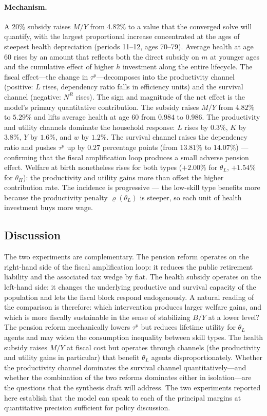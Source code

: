 \documentclass[12pt,a4paper]{article}
\begin{document}
\paragraph{Mechanism.} A 20\% subsidy raises $M/Y$ from 4.82\% to a
value that the converged solve will quantify, with the largest
proportional increase concentrated at the ages of steepest health
depreciation (periods 11--12, ages 70--79). Average health at age 60
rises by an amount that reflects both the direct subsidy on
$m$ at younger ages and the cumulative effect of higher $h$
investment along the entire lifecycle. The fiscal effect---the
change in $\tau^{p}$---decomposes into the productivity channel
(positive: $L$ rises, dependency ratio falls in efficiency units)
and the survival channel (negative: $N^{R}$ rises). The sign and
magnitude of the net effect is the model's primary quantitative
contribution. The subsidy raises $M/Y$ from $4.82\%$ to $5.29\%$ and lifts average health at age 60 from $0.984$ to $0.986$. The productivity and utility channels dominate the household response: $L$ rises by $0.3\%$, $K$ by $3.8\%$, $Y$ by $1.6\%$, and $w$ by $1.2\%$. The survival channel raises the dependency ratio and pushes $\tau^{p}$ up by $0.27$ percentage points (from $13.81\%$ to $14.07\%$) — confirming that the fiscal amplification loop produces a small adverse pension effect. Welfare at birth nonetheless rises for both types ($+2.00\%$ for $\theta_{L}$, $+1.54\%$ for $\theta_{H}$): the productivity and utility gains more than offset the higher contribution rate. The incidence is progressive — the low-skill type benefits more because the productivity penalty $\varrho(\theta_{L})$ is steeper, so each unit of health investment buys more wage.

\subsection{Discussion}
\label{subsec:exp_discussion}

The two experiments are complementary. The pension reform operates
on the right-hand side of the fiscal amplification loop: it reduces
the public retirement liability and the associated tax wedge by
fiat. The health subsidy operates on the left-hand side: it changes
the underlying productive and survival capacity of the population
and lets the fiscal block respond endogenously. A natural reading
of the comparison is therefore: which intervention produces larger
welfare gains, and which is more fiscally sustainable in the sense
of stabilizing $B/Y$ at a lower level? The pension reform
mechanically lowers $\tau^{p}$ but reduces lifetime utility for
$\theta_{L}$ agents and may widen the consumption inequality
between skill types. The health subsidy raises $M/Y$ at fiscal
cost but operates through channels (the productivity and utility
gains in particular) that benefit $\theta_{L}$ agents
disproportionately. Whether the productivity channel dominates the
survival channel quantitatively---and whether the combination of
the two reforms dominates either in isolation---are the questions
that the synthesis draft will address. The two experiments reported
here establish that the model can speak to each of the principal
margins at quantitative precision sufficient for policy discussion.
\end{document}
